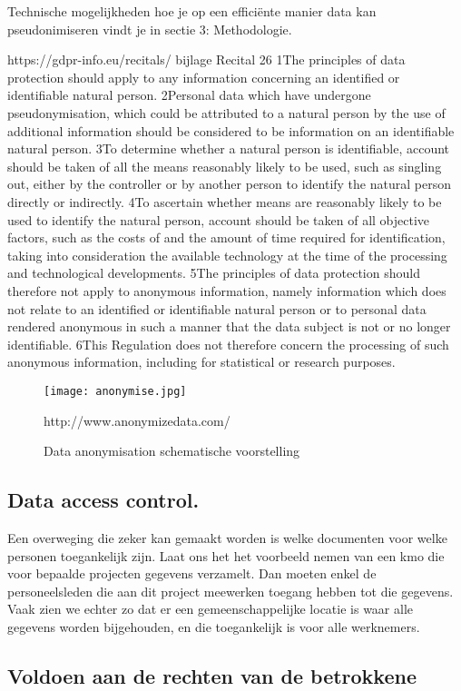 Technische mogelijkheden hoe je op een efficiënte manier data kan pseudonimiseren vindt je in sectie 3: Methodologie. 

https://gdpr-info.eu/recitals/ bijlage
Recital 26
1The principles of data protection should apply to any information concerning an identified or identifiable natural person. 2Personal data which have undergone pseudonymisation, which could be attributed to a natural person by the use of additional information should be considered to be information on an identifiable natural person. 3To determine whether a natural person is identifiable, account should be taken of all the means reasonably likely to be used, such as singling out, either by the controller or by another person to identify the natural person directly or indirectly. 4To ascertain whether means are reasonably likely to be used to identify the natural person, account should be taken of all objective factors, such as the costs of and the amount of time required for identification, taking into consideration the available technology at the time of the processing and technological developments. 5The principles of data protection should therefore not apply to anonymous information, namely information which does not relate to an identified or identifiable natural person or to personal data rendered anonymous in such a manner that the data subject is not or no longer identifiable. 6This Regulation does not therefore concern the processing of such anonymous information, including for statistical or research purposes.

\begin{figure}[h]
    \texttt{[image: anonymise.jpg]}
    \caption{Data anonymisation schematische voorstelling}
    http://www.anonymizedata.com/
\end{figure}


\subsection{Data access control.}
Een overweging die zeker kan gemaakt worden is welke documenten voor welke personen toegankelijk zijn. Laat ons het het voorbeeld nemen van een kmo die voor bepaalde projecten gegevens verzamelt. Dan moeten enkel de personeelsleden die aan dit project meewerken toegang hebben tot die gegevens.  Vaak zien we echter zo dat er een gemeenschappelijke locatie is waar alle gegevens worden bijgehouden, en die toegankelijk is voor alle werknemers. 

\subsection{Voldoen aan de rechten van de betrokkene}

